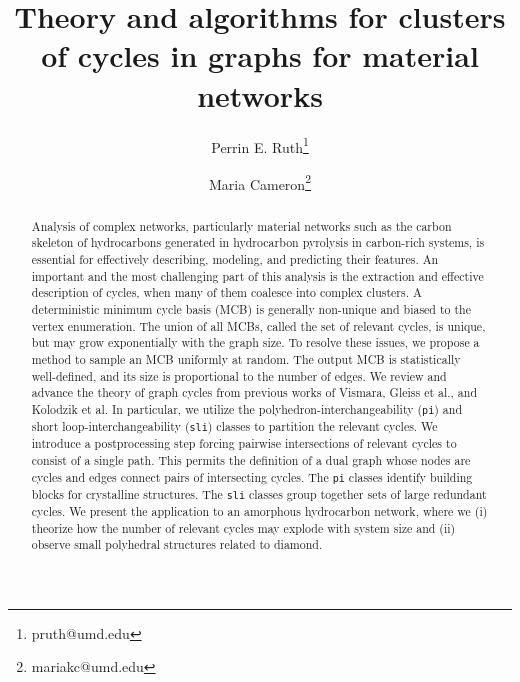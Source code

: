 \documentclass[fleqn,11pt]{article}
\begin{document}
	
	{\title{Theory and algorithms for clusters of cycles in graphs for material networks}%
		
		
		\author[1]{Perrin E. Ruth\thanks{pruth@umd.edu}}
		\author[1]{Maria Cameron\thanks{mariakc@umd.edu}}
		}
		\maketitle



\begin{abstract}
	Analysis of complex networks, particularly material networks such as the carbon skeleton of hydrocarbons generated in hydrocarbon pyrolysis in carbon-rich systems, is essential for effectively describing, modeling, and predicting their features.  An important and the most challenging part of this analysis is the extraction and effective description of cycles, when many of them coalesce into complex clusters. A deterministic minimum cycle basis (MCB) is generally non-unique and biased to the vertex enumeration. The union of all MCBs, called the set of relevant cycles, is unique, but may grow exponentially with the graph size. To resolve these issues, we propose a method to sample an MCB uniformly at random. The output MCB is statistically well-defined, and its size is proportional to the number of edges. We review and advance the theory of graph cycles from previous works of Vismara, Gleiss et al., and Kolodzik et al. In particular, we utilize the polyhedron-interchangeability ({\tt pi}) and short loop-interchangeability ({\tt sli}) classes to partition the relevant cycles. We introduce a postprocessing step forcing pairwise intersections of relevant cycles to consist of a single path. This permits the definition of a dual graph whose nodes are cycles and edges connect pairs of intersecting cycles. The {\tt pi} classes identify building blocks for crystalline structures. The {\tt sli} classes group together sets of large redundant cycles. We present the application to an amorphous hydrocarbon network, where we (i) theorize how the number of relevant cycles may explode with system size and (ii) observe small polyhedral structures related to diamond.

\end{abstract}
\end{document}
